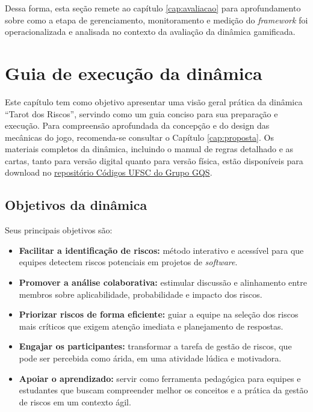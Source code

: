 \documentclass[
	12pt,
	openright,
	twoside,
	a4paper,
	english,
	brazil
	]{abntex2}
\begin{document}
Dessa forma, esta seção remete ao capítulo \ref{cap:avaliacao} para aprofundamento sobre como a etapa de gerenciamento, monitoramento e medição do \textit{framework} foi operacionalizada e analisada no contexto da avaliação da dinâmica gamificada. 


\chapter{Guia de execução da dinâmica}
\label{cap:dinamica-execucao}

Este capítulo tem como objetivo apresentar uma visão geral prática da dinâmica “Tarot dos Riscos”, servindo como um guia conciso para sua preparação e execução. Para compreensão aprofundada da concepção e do design das mecânicas do jogo, recomenda-se consultar o Capítulo \ref{cap:proposta}. Os materiais completos da dinâmica, incluindo o manual de regras detalhado e as cartas, tanto para versão digital quanto para versão física, estão disponíveis para download no \href{https://codigos.ufsc.br/gqs/tarot-dos-riscos}{repositório Códigos UFSC do Grupo GQS}.

\section{Objetivos da dinâmica}
\label{sec:objetivos-dinamica-cap5}

Seus principais objetivos são:

\begin{itemize}
\item \textbf{Facilitar a identificação de riscos:} método interativo e acessível para que equipes detectem riscos potenciais em projetos de \textit{software}.
\item \textbf{Promover a análise colaborativa:} estimular discussão e alinhamento entre membros sobre aplicabilidade, probabilidade e impacto dos riscos.
\item \textbf{Priorizar riscos de forma eficiente:} guiar a equipe na seleção dos riscos mais críticos que exigem atenção imediata e planejamento de respostas.
\item \textbf{Engajar os participantes:} transformar a tarefa de gestão de riscos, que pode ser percebida como árida, em uma atividade lúdica e motivadora.
\item \textbf{Apoiar o aprendizado:} servir como ferramenta pedagógica para equipes e estudantes que buscam compreender melhor os conceitos e a prática da gestão de riscos em um contexto ágil.
\end{itemize}
\end{document}
